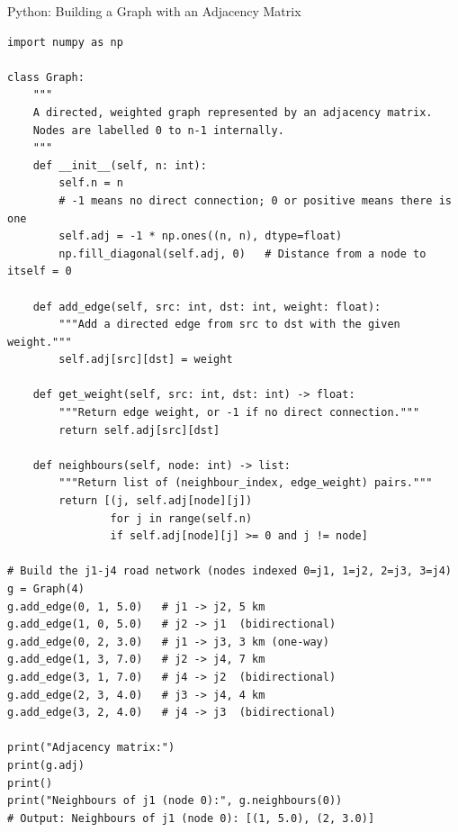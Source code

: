 \documentclass[aspectratio=169,10pt]{beamer}
\begin{document}
\begin{frame}[fragile]{Python: Building a Graph with an Adjacency Matrix}

\begin{lstlisting}[caption={Graph class using an adjacency matrix}]
import numpy as np

class Graph:
    """
    A directed, weighted graph represented by an adjacency matrix.
    Nodes are labelled 0 to n-1 internally.
    """
    def __init__(self, n: int):
        self.n = n
        # -1 means no direct connection; 0 or positive means there is one
        self.adj = -1 * np.ones((n, n), dtype=float)
        np.fill_diagonal(self.adj, 0)   # Distance from a node to itself = 0

    def add_edge(self, src: int, dst: int, weight: float):
        """Add a directed edge from src to dst with the given weight."""
        self.adj[src][dst] = weight

    def get_weight(self, src: int, dst: int) -> float:
        """Return edge weight, or -1 if no direct connection."""
        return self.adj[src][dst]

    def neighbours(self, node: int) -> list:
        """Return list of (neighbour_index, edge_weight) pairs."""
        return [(j, self.adj[node][j])
                for j in range(self.n)
                if self.adj[node][j] >= 0 and j != node]

# Build the j1-j4 road network (nodes indexed 0=j1, 1=j2, 2=j3, 3=j4)
g = Graph(4)
g.add_edge(0, 1, 5.0)   # j1 -> j2, 5 km
g.add_edge(1, 0, 5.0)   # j2 -> j1  (bidirectional)
g.add_edge(0, 2, 3.0)   # j1 -> j3, 3 km (one-way)
g.add_edge(1, 3, 7.0)   # j2 -> j4, 7 km
g.add_edge(3, 1, 7.0)   # j4 -> j2  (bidirectional)
g.add_edge(2, 3, 4.0)   # j3 -> j4, 4 km
g.add_edge(3, 2, 4.0)   # j4 -> j3  (bidirectional)

print("Adjacency matrix:")
print(g.adj)
print()
print("Neighbours of j1 (node 0):", g.neighbours(0))
# Output: Neighbours of j1 (node 0): [(1, 5.0), (2, 3.0)]
\end{lstlisting}

\end{frame}
\end{document}
